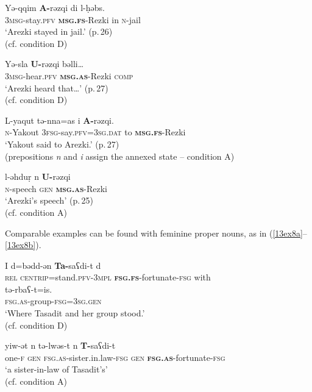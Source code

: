 \documentclass[output=paper,colorlinks,citecolor=brown]{langscibook}
\begin{document}
\begin{exe}
	\ex \label{13ex7}  \citep{sadilandri2020}
	\begin{xlist}
		\ex \label{13ex7a}
		\gll Yə-qqim \textbf{A-}rəzqi di l-ḥəbs. \\
		\textsc{3msg}-stay.\textsc{pfv} \textbf{\textsc{msg.fs}}-Rezki in \textsc{n}-jail \\
		\trans ‘Arezki stayed in jail.’ \hfill (p. 26)\\
		(cf. condition D)
		
		\ex \label{13ex7b}
		\gll Yə-sla \textbf{U-}rəzqi bəlli… \\
		\textsc{3msg}-hear.\textsc{pfv} \textbf{\textsc{msg.as}}-Rezki \textsc{comp} \\
		\trans ‘Arezki heard that…’ \hfill (p. 27)\\
		(cf. condition D)
		
		\ex \label{13ex7c}
		\gll L-yaqut tə-nna=as i \textbf{A-}rəzqi. \\
		\textsc{n}-Yakout \textsc{3fsg}-say.\textsc{pfv=3sg.dat} to \textbf{\textsc{msg.fs}}-Rezki \\
		\trans ‘Yakout said to Arezki.’ \hfill (p. 27)\\
		(prepositions \emph{n} and \emph{i} assign the annexed state – condition A)
		
		\ex \label{13ex7d}
		\gll l-əhduṛ n \textbf{U-}rəzqi \\
		\textsc{n}-speech \textsc{gen} \textbf{\textsc{msg.as}}-Rezki \\
		\trans ‘Arezki’s speech’ \hfill (p. 25)\\
		(cf. condition A)
	\end{xlist}
\end{exe}

Comparable examples can be found with feminine proper nouns, as in (\ref{13ex8a}--\ref{13ex8b}).

\begin{exe}
	\ex \label{13ex8}  \citep[18]{hamadouche2007}
	\begin{xlist}
		\ex \label{13ex8a}
		\gll I d=bədd-ən \textbf{Ta-}saʕdi-t d \\
		\textsc{rel} \textsc{centrip}=stand.\textsc{pfv}-\textsc{3mpl} \textbf{\textsc{fsg.fs}}-fortunate-\textsc{fsg} with \\
		
		tə-rbaʕ-t=is. \\
		\textsc{fsg.as}-group-\textsc{fsg=3sg.gen} \\
		\trans ‘Where Tasadit and her group stood.’ \\
		(cf. condition D)
		
		\ex \label{13ex8b}
		\gll yiw-ət n tə-lwəs-t n \textbf{T-}saʕdi-t \\
		one-\textsc{f} \textsc{gen} \textsc{fsg.as}-sister.in.law-\textsc{fsg} \textsc{gen} \textbf{\textsc{fsg.as}}-fortunate-\textsc{fsg} \\
		\trans ‘a sister-in-law of Tasadit’s’ \\
		(cf. condition A)
	\end{xlist}
\end{exe}
\end{document}
